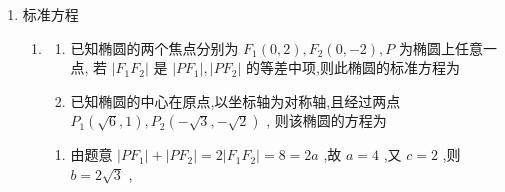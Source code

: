 \begin{enumerate}
\begin{enumerate}
\begin{jieda}
            
            则由椭圆的定义可得 $\bigtriangleup {ABF}$ 的周长\\
            $\left| {AF}\right|  + \left| {BF}\right|  + \left| {AB}\right|  = {2a} - \left| {A{F}_{1}}\right|  + {2a} - \left| {B{F}_{1}}\right|  + \left| {AB}\right|  = {4a} + \left| {AB}\right|$  $- \left| {A{F}_{1}}\right|  - \left| {B{F}_{1}}\right|  = {20} + \left| {AB}\right|  - \left| {A{F}_{1}}\right|  - \left| {B{F}_{1}}\right|$\\
            当 $A,B,{F}_{1}$ 共线时, $\left| {AB}\right|  - \left| {A{F}_{1}}\right|  - \left| {B{F}_{1}}\right|  = 0$ , 当 $A,B,{F}_{1}$ 不共线时, $\left| {AB}\right|  - \left| {A{F}_{1}}\right|  - \left| {B{F}_{1}}\right|  < 0$ , 所以 $\bigtriangleup {ABF}$ 周长的最大值为 20 .
        \end{jieda}
    \end{enumerate}
    \item 标准方程
    \begin{enumerate}
        \item \begin{enumerate}
            \item 已知椭圆的两个焦点分别为 ${F}_{1}\left( {0,2}\right) ,{F}_{2}\left( {0, - 2}\right) ,P$ 为椭圆上任意一点, 若 $\left| {{F}_{1}{F}_{2}}\right|$ 是 $\left| {P{F}_{1}}\right| ,\left| {P{F}_{2}}\right|$ 的等差中项,则此椭圆的标准方程为
            \item 已知椭圆的中心在原点,以坐标轴为对称轴,且经过两点 ${P}_{1}\left( {\sqrt{6},1}\right) ,{P}_{2}\left( {-\sqrt{3}, - \sqrt{2}}\right)$ , 则该椭圆的方程为
        \end{enumerate}
        \begin{jieda}
            \begin{enumerate}
                \item 由题意 $\left| {P{F}_{1}}\right|  + \left| {P{F}_{2}}\right|  = 2\left| {{F}_{1}{F}_{2}}\right|  = 8 = {2a}$ ,故 $a = 4$ ,又 $c = 2$ ,则 $b = 2\sqrt{3}$ ,


\end{enumerate}
\end{jieda}
\end{enumerate}
\end{enumerate}
